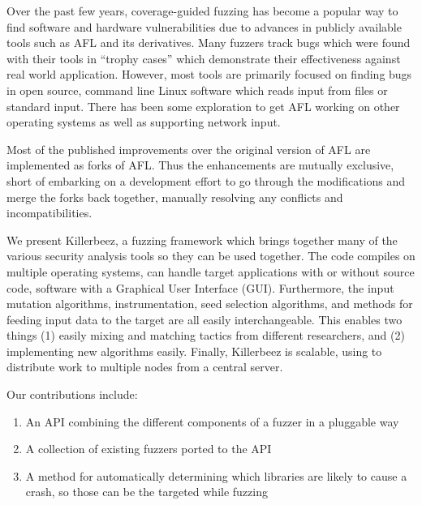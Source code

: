 Over the past few years, coverage-guided fuzzing has become a popular way to
find software and hardware vulnerabilities due to advances in publicly
available tools such as AFL\cite{afl} and its derivatives.\cite{vanhauser} Many
fuzzers track bugs which were found with their tools in ``trophy cases'' which
demonstrate their effectiveness against real world application.  However, most
tools are primarily focused on finding bugs in open source, command line Linux
software which reads input from files or standard input. There has been some
exploration to get AFL working on other operating
systems\cite{aflosx}\cite{winafl} as well as supporting network
input.\cite{netafl}\cite{preeny}

Most of the published improvements over the original version of AFL are
implemented as forks of
AFL.\cite{aflfast}\cite{aflgo}\cite{fairfuzz}\cite{perffuzz}\cite{pythia}\cite{collafl}
Thus the enhancements are mutually exclusive, short of embarking on a
development effort to go through the modifications and merge the forks back
together, manually resolving any conflicts and incompatibilities.

We present Killerbeez, a fuzzing framework which brings together many of the
various security analysis tools so they can be used together.  The code
compiles on multiple operating systems, can handle target applications with or
without source code, software with a Graphical User Interface (GUI).
Furthermore, the input mutation algorithms, instrumentation, seed selection
algorithms, and methods for feeding input data to the target are all easily
interchangeable.  This enables two things (1) easily mixing and matching
tactics from different researchers, and (2) implementing new algorithms easily.
Finally, Killerbeez is scalable, using \BOINC{}\cite{boinc} to distribute work
to multiple nodes from a central server.

Our contributions include:
\begin{enumerate}[noitemsep]
\item An API combining the different components of a fuzzer in a pluggable way
\item A collection of existing fuzzers ported to the API
\item A method for automatically determining which libraries are likely to
	cause a crash, so those can be the targeted while fuzzing
\end{enumerate}

